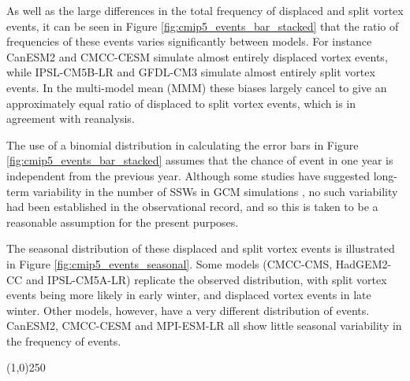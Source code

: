 As well as the large differences in the total frequency of displaced and split
vortex events, it can be seen in Figure \ref{fig:cmip5_events_bar_stacked} that
the ratio of frequencies of these events varies significantly between
models. For instance CanESM2 and CMCC-CESM simulate almost entirely displaced
vortex events, while IPSL-CM5B-LR and GFDL-CM3 simulate almost entirely split
vortex events. In the multi-model mean (MMM) these biases largely cancel to give
an approximately equal ratio of displaced to split vortex events, which is in
agreement with reanalysis.

The use of a binomial distribution in calculating the error bars in Figure
\ref{fig:cmip5_events_bar_stacked} assumes that the chance of event in one year
is independent from the previous year. Although some studies have suggested
long-term variability in the number of SSWs in GCM simulations
\citep[e.g.,][]{Schimanke2011}, no such variability had been established in the
observational record, and so this is taken to be a reasonable assumption for the
present purposes.

The seasonal distribution of these displaced and split vortex events is
illustrated in Figure \ref{fig:cmip5_events_seasonal}. Some models (CMCC-CMS,
HadGEM2-CC and IPSL-CM5A-LR) replicate the observed distribution, with split
vortex events being more likely in early winter, and displaced vortex events in
late winter. Other models, however, have a very different
distribution of events. CanESM2, CMCC-CESM and MPI-ESM-LR all show little
seasonal variability in the frequency of events. 
\begin{center}
\line(1,0){250}
\end{center}

